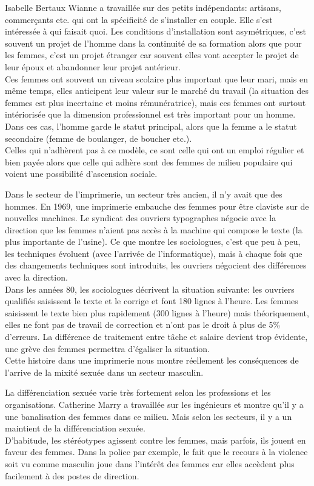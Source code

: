 \documentclass[10pt, a4paper, openany]{book}
\begin{document}
Isabelle Bertaux Wianne a travaillée sur des petits indépendants: artisans, commerçants etc. qui ont la spécificité de s'installer en couple. Elle s'est intéressée à qui faisait quoi. Les conditions d'installation sont asymétriques, c'est souvent un projet de l'homme dans la continuité de sa formation alors que pour les femmes, c'est un projet étranger car souvent elles vont accepter le projet de leur époux et abandonner leur projet antérieur. \\
Ces femmes ont souvent un niveau scolaire plus important que leur mari, mais en même temps, elles anticipent leur valeur sur le marché du travail (la situation des femmes est plus incertaine et moins rémunératrice), mais ces femmes ont surtout intériorisée que la dimension professionnel est très important pour un homme. Dans ces cas, l'homme garde le statut principal, alors que la femme a le statut secondaire (femme de boulanger, de boucher etc.). \\
Celles qui n'adhèrent pas à ce modèle, ce sont celle qui ont un emploi régulier et bien payée alors que celle qui adhère sont des femmes de milieu populaire qui voient une possibilité d'ascension sociale. 


Dans le secteur de l'imprimerie, un secteur très ancien, il n'y avait que des hommes. En 1969, une imprimerie embauche des femmes pour être claviste sur de nouvelles machines. Le syndicat des ouvriers typographes négocie avec la direction que les femmes n'aient pas accès à la machine qui compose le texte (la plus importante de l'usine). Ce que montre les sociologues, c'est que peu à peu, les techniques évoluent (avec l'arrivée de l'informatique), mais à chaque fois que des changements techniques sont introduits, les ouvriers négocient des différences avec la direction. \\
Dans les années 80, les sociologues décrivent la situation suivante: les ouvriers qualifiés saisissent le texte et le corrige et font 180 lignes à l'heure. Les femmes saisissent le texte bien plus rapidement (300 lignes à l'heure) mais théoriquement, elles ne font pas de travail de correction et n'ont pas le droit à plus de 5\% d'erreurs. La différence de traitement entre tâche et salaire devient trop évidente, une grève des femmes permettra d'égaliser la situation. \\
Cette histoire dans une imprimerie nous montre réellement les conséquences de l'arrive de la mixité sexuée dans un secteur masculin.


La différenciation sexuée varie très fortement selon les professions et les organisations. Catherine Marry a travaillée sur les ingénieurs et montre qu'il y a une banalisation des femmes dans ce milieu. Mais selon les secteurs, il y a un maintient de la différenciation sexuée. \\
D'habitude, les stéréotypes agissent contre les femmes, mais parfois, ils jouent en faveur des femmes. Dans la police par exemple, le fait que le recours à la violence soit vu comme masculin joue dans l'intérêt des femmes car elles accèdent plus facilement à des postes de direction. 
\end{document}
